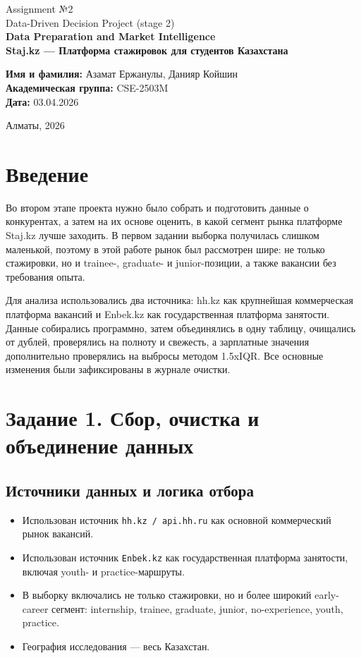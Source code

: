 \documentclass[12pt,a4paper]{article}
\begin{document}
\begin{titlepage}
\begin{center}
{\large Assignment №2}\\
{\large Data-Driven Decision Project (stage 2)}\\[2cm]
{\LARGE \textbf{Data Preparation and Market Intelligence}}\\[1cm]
{\Large \textbf{Staj.kz --- Платформа стажировок для студентов Казахстана}}\\[3cm]
\end{center}

\noindent \textbf{Имя и фамилия:} Азамат Ержанулы, Данияр Койшин\\
\textbf{Академическая группа:} CSE-2503M\\
\textbf{Дата:} 03.04.2026

\vfill

\begin{center}
Алматы, 2026
\end{center}
\end{titlepage}

\section*{Введение}
Во втором этапе проекта нужно было собрать и подготовить данные о конкурентах, а затем на их основе оценить, в какой сегмент рынка платформе Staj.kz лучше заходить. В первом задании выборка получилась слишком маленькой, поэтому в этой работе рынок был рассмотрен шире: не только стажировки, но и trainee-, graduate- и junior-позиции, а также вакансии без требования опыта.

Для анализа использовались два источника: hh.kz как крупнейшая коммерческая платформа вакансий и Enbek.kz как государственная платформа занятости. Данные собирались программно, затем объединялись в одну таблицу, очищались от дублей, проверялись на полноту и свежесть, а зарплатные значения дополнительно проверялись на выбросы методом 1.5xIQR. Все основные изменения были зафиксированы в журнале очистки.

\section{Задание 1. Сбор, очистка и объединение данных}

\subsection{Источники данных и логика отбора}
\begin{itemize}
\item Использован источник \texttt{hh.kz / api.hh.ru} как основной коммерческий рынок вакансий.
\item Использован источник \texttt{Enbek.kz} как государственная платформа занятости, включая youth- и practice-маршруты.
\item В выборку включались не только стажировки, но и более широкий early-career сегмент: internship, trainee, graduate, junior, no-experience, youth, practice.
\item География исследования --- весь Казахстан.
\end{itemize}
\end{document}
